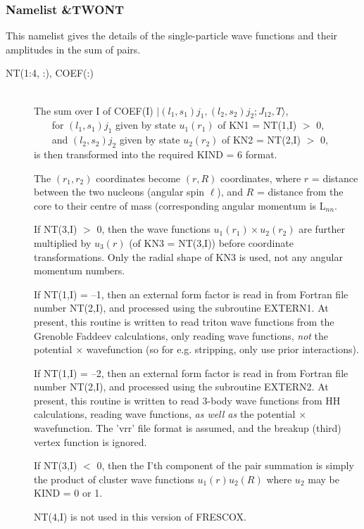 \documentclass[11pt]{article}
\begin{document}
\subsubsection{Namelist \&TWONT}
This namelist gives the details of the single-particle wave functions and their amplitudes in the sum of pairs.
%
\begin{description}
\item[NT(1:4, :), COEF(:)] ~\\
The sum over I of  COEF(I) $| (l_1,s_1)j_1, (l_2,s_2)j_2 ; J_{12},T \rangle$,
\\
 \mbox{~~~} for  $(l_1,s_1)j_1$  given by state $u_1(r_1)$ of KN1 = NT(1,I) $>$ 0,
\\
 \mbox{~~~}    and  $(l_2,s_2)j_2$  given by state $u_2(r_2)$ of KN2 = NT(2,I) $>$ 0,
\\
is then transformed into the required KIND = 6 format.

The $(r_1,r_2)$ coordinates become $(r,R)$ coordinates,
where
$r$ = distance between the two nucleons (angular spin $\ell$), and
$R$ = distance from the core to their centre of mass
     (corresponding angular momentum is L$_{nn}$.

If NT(3,I) $>$ 0, then the wave functions $u_1(r_1)\times u_2(r_2)$ are further
multiplied by $u_3(r)$ (of KN3 = NT(3,I)) before coordinate transformations.
Only the radial shape of KN3 is used, not any angular momentum numbers.

If NT(1,I) = --1, then an external form factor is read in from Fortran file
number NT(2,I), and processed using the subroutine EXTERN1.
At present, this routine is written to read triton wave functions
from the Grenoble Faddeev calculations,
only reading wave functions, {\em not} the potential $\times$
wavefunction (so for e.g. stripping, only use prior interactions).

If NT(1,I) = --2, then an external form factor is read in from Fortran file
number NT(2,I), and processed using the subroutine EXTERN2.
At present, this routine is written to read 3-body wave functions
from HH calculations, reading wave functions, {\em as well as} the
potential $\times$ wavefunction. The 'vrr' file format is assumed,
and the breakup (third) vertex function  is ignored.

If NT(3,I) $<$ 0, then the I'th component of the pair summation is simply
the product of cluster wave functions $u_1(r)  u_2(R) $
where $u_{2}$ may be KIND = 0 or 1.

NT(4,I) is not used in this version of FRESCOX.
\end{description}
\end{document}
